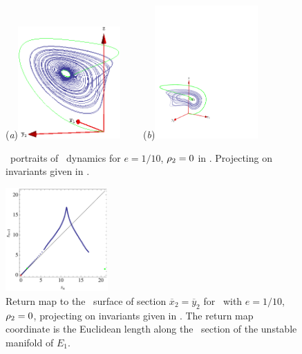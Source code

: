 \begin{figure}[ht]
\begin{center}
  (\textit{a})\includegraphics[width=0.35\textwidth]{../figs/CLEinvXYZ}
~~~~(\textit{b})\includegraphics[width=0.35\textwidth]{../figs/CLEinvYYZ}
\end{center}
\caption[Orbit space projection of Complex Lorenz flow: Modified moving frame]{ \Statesp\
portraits of \CLe\ dynamics for $e=1/10$, $\rho_2=0$
in \reducedsp. Projecting on invariants given in .
    }
\label{fig:CLEinv}
\end{figure}

\begin{figure}[ht]
\begin{center}
\includegraphics[width=0.35\textwidth]{../figs/CLEinvRM}
\end{center}
\caption[Return map for Complex Lorenz flow]{
Return map to the \Poincare\ surface of section
$\overline{x}_2=\overline{y}_2$ for \CLe\ with $e=1/10$,
$\rho_2=0$, projecting on invariants given in
. The return map coordinate is the
Euclidean length along the \Poincare\ section of the unstable
manifold of $E_1$.
    }
\label{fig:CLEinvRM}
\end{figure}


